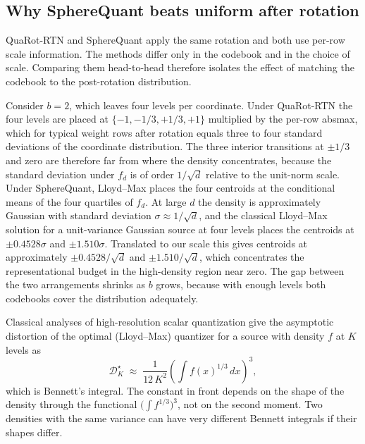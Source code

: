 \subsection{Why SphereQuant beats uniform after rotation}
\label{sec:method-whybeats}

QuaRot-RTN and SphereQuant apply the same rotation and both use per-row scale
information. The methods differ only in the codebook and in the choice of
scale. Comparing them head-to-head therefore isolates the effect of
matching the codebook to the post-rotation distribution.

Consider $b = 2$, which leaves four levels per coordinate. Under
QuaRot-RTN the four levels are placed at $\{-1, -1/3, +1/3, +1\}$
multiplied by the per-row absmax, which for typical weight rows after
rotation equals three to four standard deviations of the coordinate
distribution. The three interior transitions at $\pm 1/3$ and zero are
therefore far from where the density concentrates, because the standard
deviation under $f_d$ is of order $1/\sqrt{d}$ relative to the unit-norm
scale. Under SphereQuant, Lloyd--Max places the four centroids at the conditional
means of the four quartiles of $f_d$. At large $d$ the density is
approximately Gaussian with standard deviation $\sigma \approx
1/\sqrt{d}$, and the classical Lloyd--Max solution for a unit-variance
Gaussian source at four levels \citep{max1960} places the centroids at
$\pm 0.4528\sigma$ and $\pm 1.510\sigma$. Translated to our scale this
gives centroids at approximately $\pm 0.4528/\sqrt{d}$ and
$\pm 1.510/\sqrt{d}$, which concentrates the representational budget in
the high-density region near zero. The gap between the two arrangements
shrinks as $b$ grows, because with enough levels both codebooks cover the
distribution adequately.

Classical analyses of high-resolution scalar quantization
\citep{bennett1948, panter1951, gershogray1992} give the asymptotic
distortion of the optimal (Lloyd--Max) quantizer for a source with
density $f$ at $K$ levels as
\begin{equation}
\mathcal{D}^\star_K \;\approx\; \frac{1}{12\, K^2}
    \left( \int f(x)^{1/3}\, dx \right)^3,
\label{eq:bennett}
\end{equation}
which is Bennett's integral. The constant in front depends on the shape
of the density through the functional $\big(\int f^{1/3}\big)^3$, not on
the second moment. Two densities with the same variance can have very
different Bennett integrals if their shapes differ.

